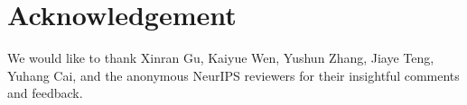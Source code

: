 
\section{Acknowledgement}
We would like to thank Xinran Gu, Kaiyue Wen, Yushun Zhang, Jiaye Teng, Yuhang Cai, and the anonymous NeurIPS reviewers for their insightful comments and feedback.
